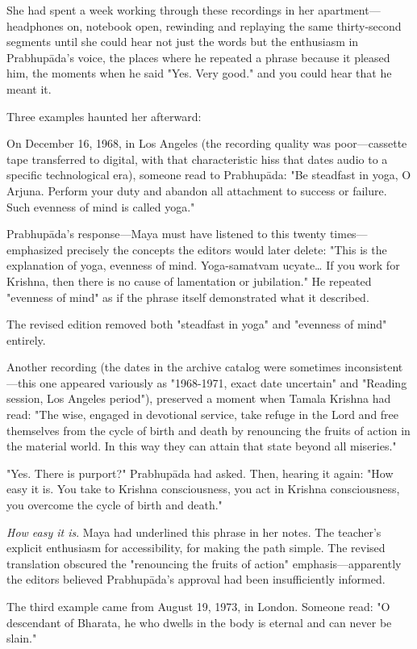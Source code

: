 \documentclass[12pt,twoside]{book}
\begin{document}
She had spent a week working through these recordings in her apartment—headphones on, notebook open, rewinding and replaying the same thirty-second segments until she could hear not just the words but the enthusiasm in Prabhupāda's voice, the places where he repeated a phrase because it pleased him, the moments when he said "Yes. Very good." and you could hear that he meant it.

Three examples haunted her afterward:

On December 16, 1968, in Los Angeles (the recording quality was poor—cassette tape transferred to digital, with that characteristic hiss that dates audio to a specific technological era), someone read to Prabhupāda: "Be steadfast in yoga, O Arjuna. Perform your duty and abandon all attachment to success or failure. Such evenness of mind is called yoga."

Prabhupāda's response—Maya must have listened to this twenty times—emphasized precisely the concepts the editors would later delete: "This is the explanation of yoga, evenness of mind. Yoga-samatvam ucyate\ldots{} If you work for Krishna, then there is no cause of lamentation or jubilation." He repeated "evenness of mind" as if the phrase itself demonstrated what it described.

The revised edition removed both "steadfast in yoga" and "evenness of mind" entirely.

Another recording (the dates in the archive catalog were sometimes inconsistent—this one appeared variously as "1968-1971, exact date uncertain" and "Reading session, Los Angeles period"), preserved a moment when Tamala Krishna had read: "The wise, engaged in devotional service, take refuge in the Lord and free themselves from the cycle of birth and death by renouncing the fruits of action in the material world. In this way they can attain that state beyond all miseries."

"Yes. There is purport?" Prabhupāda had asked. Then, hearing it again: "How easy it is. You take to Krishna consciousness, you act in Krishna consciousness, you overcome the cycle of birth and death."

\emph{How easy it is}. Maya had underlined this phrase in her notes. The teacher's explicit enthusiasm for accessibility, for making the path simple. The revised translation obscured the "renouncing the fruits of action" emphasis—apparently the editors believed Prabhupāda's approval had been insufficiently informed.

The third example came from August 19, 1973, in London. Someone read: "O descendant of Bharata, he who dwells in the body is eternal and can never be slain."
\end{document}
